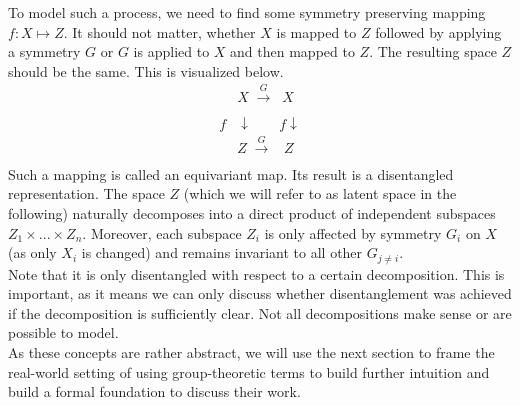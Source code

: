 \documentclass{article} %
\begin{document}
To model such a process, we need to find some symmetry preserving mapping $f:X\mapsto Z$. It should not matter, whether $X$ is mapped to $Z$ followed by applying a symmetry $G$ or $G$ is applied to $X$ and then mapped to $Z$. The resulting space $Z$ should be the same. This is visualized below.
\begin{align*}
&X \;\xrightarrow[\text{}]{G}\;\;X\\ 
f&\downarrow \;\;\;\;\;\;\;f\downarrow\\
&Z \;\xrightarrow[\text{}]{G}\;\;\;Z
\end{align*}
Such a mapping is called an equivariant map. Its result is a disentangled representation. The space $Z$ (which we will refer to as latent space in the following) naturally decomposes into a direct product of independent subspaces $Z_1 \times ... \times Z_n$. Moreover, each subspace $Z_i$ is only affected by symmetry $G_i$ on $X$ (as only $X_i$ is changed) and remains invariant to all other $G_{j \neq i}$.\\
Note that it is only disentangled with respect to a certain decomposition. This is important, as it means we can only discuss whether disentanglement was achieved if the decomposition is sufficiently clear. Not all decompositions make sense or are possible to model.\\
As these concepts are rather abstract, we will use the next section to frame the real-world setting of \citet{hsu2017unsupervised} using group-theoretic terms to build further intuition and build a formal foundation to discuss their work.
\end{document}
